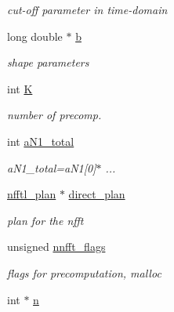 \begin{DoxyCompactItemize}
\begin{DoxyCompactList}\small\item\em cut-\/off parameter in time-\/domain \end{DoxyCompactList}\item 
\hypertarget{structnnfftl__plan_ada085ec8f6099bfcaa7a193745689c9a}{long double $\ast$ \hyperlink{structnnfftl__plan_ada085ec8f6099bfcaa7a193745689c9a}{b}}\label{structnnfftl__plan_ada085ec8f6099bfcaa7a193745689c9a}

\begin{DoxyCompactList}\small\item\em shape parameters \end{DoxyCompactList}\item 
int \hyperlink{structnnfftl__plan_a574648230ce316a55282f362774aa615}{K}
\begin{DoxyCompactList}\small\item\em number of precomp. \end{DoxyCompactList}\item 
int \hyperlink{structnnfftl__plan_aa791fcca6424d42640020e178e8319e7}{a\-N1\-\_\-total}
\begin{DoxyCompactList}\small\item\em a\-N1\-\_\-total=a\-N1\mbox{[}0\mbox{]}$\ast$ ... \end{DoxyCompactList}\item 
\hypertarget{structnnfftl__plan_aa59e9ff1ad2fe1d90e077451831c6596}{\hyperlink{structnfftl__plan}{nfftl\-\_\-plan} $\ast$ \hyperlink{structnnfftl__plan_aa59e9ff1ad2fe1d90e077451831c6596}{direct\-\_\-plan}}\label{structnnfftl__plan_aa59e9ff1ad2fe1d90e077451831c6596}

\begin{DoxyCompactList}\small\item\em plan for the nfft \end{DoxyCompactList}\item 
\hypertarget{structnnfftl__plan_a1a9bf1751caf842fb44f70a4cbab8744}{unsigned \hyperlink{structnnfftl__plan_a1a9bf1751caf842fb44f70a4cbab8744}{nnfft\-\_\-flags}}\label{structnnfftl__plan_a1a9bf1751caf842fb44f70a4cbab8744}

\begin{DoxyCompactList}\small\item\em flags for precomputation, malloc \end{DoxyCompactList}\item 
\hypertarget{structnnfftl__plan_ad8d9bc5c5ae9f1ee6c813839ff831d97}{int $\ast$ \hyperlink{structnnfftl__plan_ad8d9bc5c5ae9f1ee6c813839ff831d97}{n}}\label{structnnfftl__plan_ad8d9bc5c5ae9f1ee6c813839ff831d97}


\end{DoxyCompactItemize}
